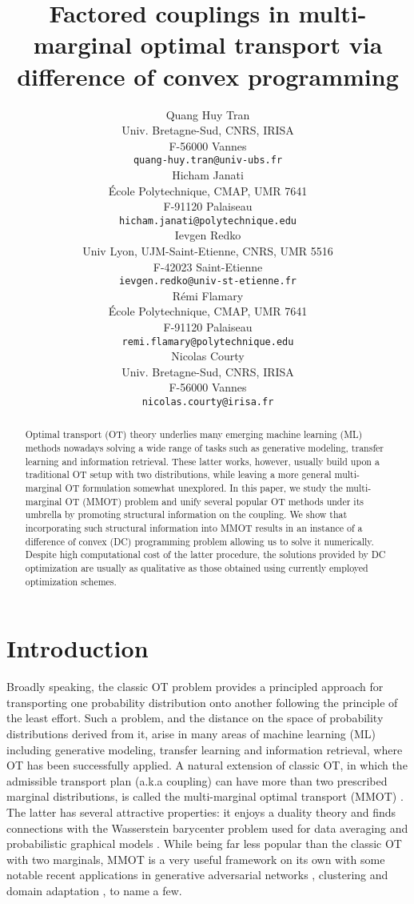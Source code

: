 \documentclass{article}
\title{Factored couplings in multi-marginal optimal transport via difference of convex programming}
\author{
  Quang Huy Tran \\
  Univ. Bretagne-Sud, CNRS, IRISA \\
  F-56000 Vannes \\
  \texttt{quang-huy.tran@univ-ubs.fr} \\
  \And
  Hicham Janati \\
  École Polytechnique, CMAP, UMR 7641 \\
  F-91120 Palaiseau \\
  \texttt{hicham.janati@polytechnique.edu} \\
  \AND
  Ievgen Redko \\
  Univ Lyon, UJM-Saint-Etienne, CNRS, UMR 5516 \\
  F-42023 Saint-Etienne \\
  \texttt{ievgen.redko@univ-st-etienne.fr} \\
  \And
  Rémi Flamary \\
  École Polytechnique, CMAP, UMR 7641 \\
  F-91120 Palaiseau \\
  \texttt{remi.flamary@polytechnique.edu} \\
  \And
  Nicolas Courty \\
  Univ. Bretagne-Sud, CNRS, IRISA \\
  F-56000 Vannes \\
  \texttt{nicolas.courty@irisa.fr} \\
}
\begin{document}
\maketitle

\begin{abstract}
    Optimal transport (OT) theory underlies many emerging machine learning (ML) methods nowadays solving a wide range of tasks such as generative modeling, transfer learning and information retrieval. These latter works, however, usually 
    build upon a traditional OT setup with two distributions, while leaving a more general multi-marginal OT formulation somewhat 
    unexplored. In this paper, we study the multi-marginal OT (MMOT) problem and unify several popular OT methods under its umbrella 
    by promoting structural information on the coupling. We show that incorporating such structural 
    information into MMOT results in an instance of a difference of convex (DC) programming problem allowing us to solve it numerically. 
    Despite high computational cost of the latter procedure, the solutions provided by DC optimization are usually as qualitative as 
    those obtained using currently employed optimization schemes.
\end{abstract}

\section{Introduction}
Broadly speaking, the classic OT problem provides a principled approach for transporting one probability distribution onto another following the principle of the least effort. Such a problem, and the distance on the space of probability distributions derived from it, arise in many areas of machine learning (ML) including generative modeling, transfer learning and information retrieval, where OT has been successfully applied. A natural extension of classic OT, in which the admissible transport plan (a.k.a coupling) can have more than two prescribed marginal distributions, is called the multi-marginal optimal transport (MMOT) \citep{Gangbo98}. 
The latter has several attractive properties: it enjoys a duality theory \citep{Kellerer84} and finds connections with the Wasserstein barycenter problem \citep{Agueh11} used for data averaging and 
probabilistic graphical models \citep{Haasler20}. While being far less popular than the classic OT with two marginals, MMOT is a very useful framework on its own with some notable recent applications in generative adversarial 
networks \citep{Cao19}, clustering \citep{Mi21} and domain adaptation \citep{HuiLCHY18,HeZKSC19}, to name a few. 
\end{document}
